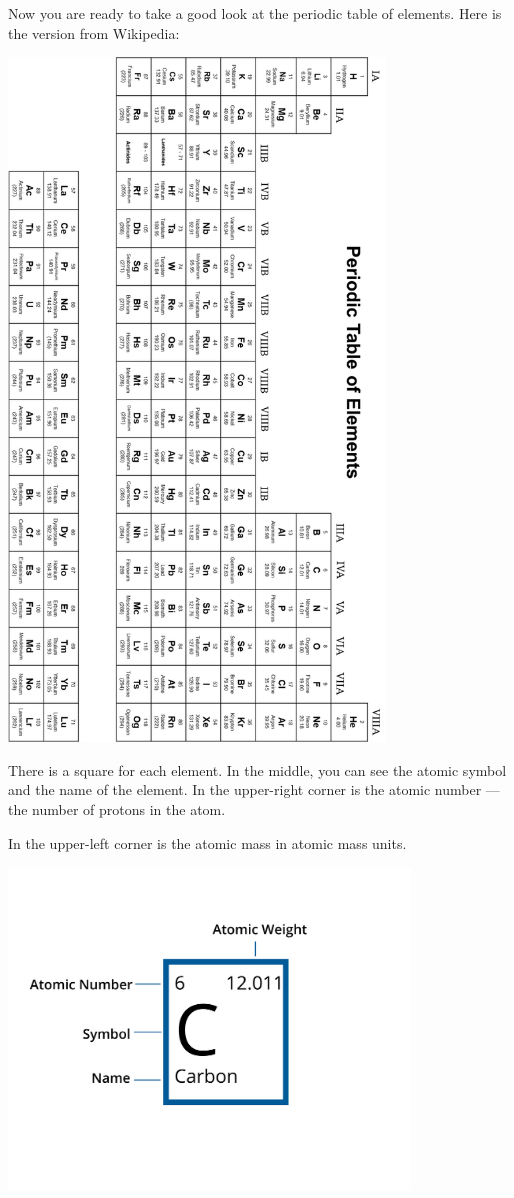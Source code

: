 \pagebreak


Now you are ready to take a good look at the periodic table of
elements. Here is the version from Wikipedia:

\includegraphics[width=0.75\textwidth]{periodic.png}


\pagebreak
There is a square for each element. In the middle, you can see the atomic
symbol and the name of the element. In the upper-right corner is the
atomic number --- the number of protons in the atom.

In the upper-left corner is the atomic mass in atomic mass units.

\includegraphics[width=0.8\textwidth]{element.png}

